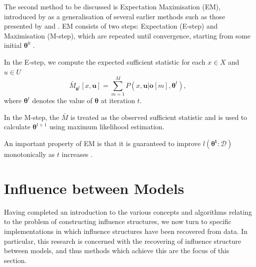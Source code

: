\documentclass [11pt]{article}
\begin{document}
The second method to be discussed is Expectation Maximisation (EM), introduced by \cite{dempster77} as a generalisation of several earlier methods such as those presented by \cite{baum70} and \cite{orchard72}. EM consists of two steps: Expectation (E-step) and Maximisation (M-step), which are repeated until convergence, starting from some initial $\boldsymbol{\theta}^{0}$  \citep{koller09}. 

In the E-step, we compute the expected sufficient statistic for each $x\in X$ and $u \in U$
\begin{equation*}
\bar{M}_{\boldsymbol{\theta}^{t}}[x,\boldsymbol{u}] = \sum_{m=1}^{M}P(x,\boldsymbol{u}|\boldsymbol{o}[m],\boldsymbol{\theta}^{t}),
\end{equation*}
where $\boldsymbol{\theta}^{t}$ denotes the value of $\boldsymbol{\theta}$ at iteration $t$.

In the M-step, the $\bar{M}$ is treated as the observed sufficient statistic and is used to calculate $\boldsymbol{\theta}^{t+1}$ using maximum likelihood estimation.

An important property of EM is that it is guaranteed to improve $l(\boldsymbol{\theta^{t}}:\mathcal{D})$ monotonically as $t$ increases \citep{koller09}.
%
\section{Influence between Models}\label{InfluenceBetweenModels}
Having completed an introduction to the various concepts and algorithms relating to the problem of constructing influence structures, we now turn to specific implementations in which influence structures have been recovered from data. In particular, this research is concerned with the recovering of influence structure between models, and thus methods which achieve this are the focus of this section.
\end{document}
